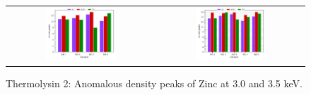 \begin{figure}
    \centering
    \begin{tabular}{cc}
        \includegraphics[width = 0.5\textwidth]{plots/exp1/tlys_2_P6122/peaks/3p0_zinc.pdf} & \includegraphics[width = 0.5\textwidth]{plots/exp1/tlys_2_P6122/peaks/3p5_zinc.pdf}
    \end{tabular}
    \caption{Thermolysin 2: Anomalous density peaks of Zinc at 3.0 and 3.5 \unit{keV}.}
    \label{fig:tlys2_zn_peaks}
\end{figure}